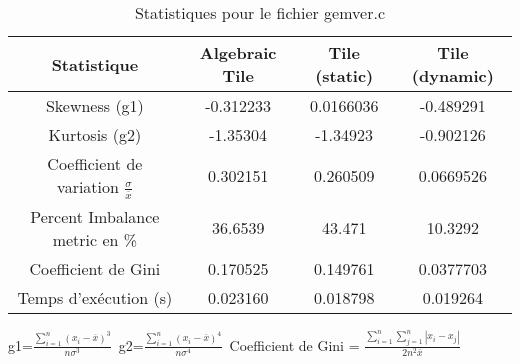 \documentclass{article}
\begin{document}
\begin{table}[htbp]
  \centering
  \caption{Statistiques pour le fichier gemver.c}
  \begin{tabular}{|c|c|c|c|}
    \hline
    Statistique & Algebraic Tile & Tile (static) & Tile (dynamic) \\ 
    \hline
    Skewness (g1)  & -0.312233 & 0.0166036 & -0.489291 \\ 
    Kurtosis (g2)  & -1.35304 & -1.34923 & -0.902126 \\ 
    Coefficient de variation $ \frac{\sigma}{\overline{x}} $ & 0.302151 & 0.260509 & 0.0669526\\ 
    Percent Imbalance metric en \% & 36.6539 & 43.471 & 10.3292\\ 
    Coefficient de Gini  & 0.170525 & 0.149761 & 0.0377703\\ 
    Temps d'exécution (s) &  0.023160    &  0.018798   &  0.019264   \\ 

    \hline
  \end{tabular}
\end{table}
g1=$ \frac{\sum_{i=1}^{n} (x_i - \overline{x})^3}{n\sigma^3} $\
g2=$ \frac{\sum_{i=1}^{n} (x_i - \overline{x})^4}{n\sigma^4} $\
Coefficient de Gini = $ \frac{\sum_{i=1}^{n}\sum_{j=1}^{n} |x_i - x_j|}{2n^2\overline{x}} $\
\newpage
\end{document}
